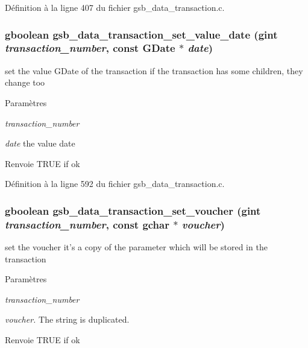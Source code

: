 Définition à la ligne 407 du fichier gsb\_\-data\_\-transaction.c.

\subsubsection[{gsb\_\-data\_\-transaction\_\-set\_\-value\_\-date}]{\setlength{\rightskip}{0pt plus 5cm}gboolean gsb\_\-data\_\-transaction\_\-set\_\-value\_\-date (gint {\em transaction\_\-number}, \/  const GDate $\ast$ {\em date})}\label{gsb__data__transaction_8c_a4c7ae911e47c4968dea14e48bafa34ff}
set the value GDate of the transaction if the transaction has some children, they change too


\begin{DoxyParams}{Paramètres}
\item[{\em transaction\_\-number}]\item[{\em date}]the value date\end{DoxyParams}
\begin{DoxyReturn}{Renvoie}
TRUE if ok 
\end{DoxyReturn}


Définition à la ligne 592 du fichier gsb\_\-data\_\-transaction.c.

\subsubsection[{gsb\_\-data\_\-transaction\_\-set\_\-voucher}]{\setlength{\rightskip}{0pt plus 5cm}gboolean gsb\_\-data\_\-transaction\_\-set\_\-voucher (gint {\em transaction\_\-number}, \/  const gchar $\ast$ {\em voucher})}\label{gsb__data__transaction_8c_a19ae235973c5bd3bbf35b25c12cc383e}
set the voucher it's a copy of the parameter which will be stored in the transaction 
\begin{DoxyParams}{Paramètres}
\item[{\em transaction\_\-number}]\item[{\em voucher.}]The string is duplicated. \end{DoxyParams}
\begin{DoxyReturn}{Renvoie}
TRUE if ok 
\end{DoxyReturn}


